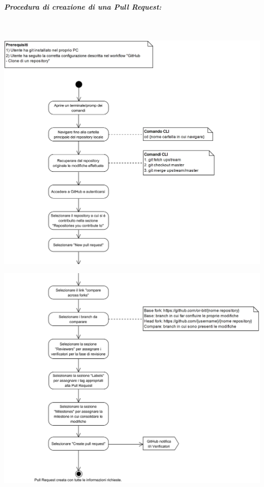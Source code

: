 \begin{samepage}
	\subparagraph{Procedura di creazione di una Pull Request:}\mbox{}\\
	
	\begin{center}
		\includegraphics[width=15cm]{../../documenti/NormeDiProgetto/DiagrammiProcedure/GitHub-CreazionePullRequest1.png}
	\end{center}	
\end{samepage}

\begin{center}
	\includegraphics[width=15cm]{../../documenti/NormeDiProgetto/DiagrammiProcedure/GitHub-CreazionePullRequest2.png}
\end{center}

